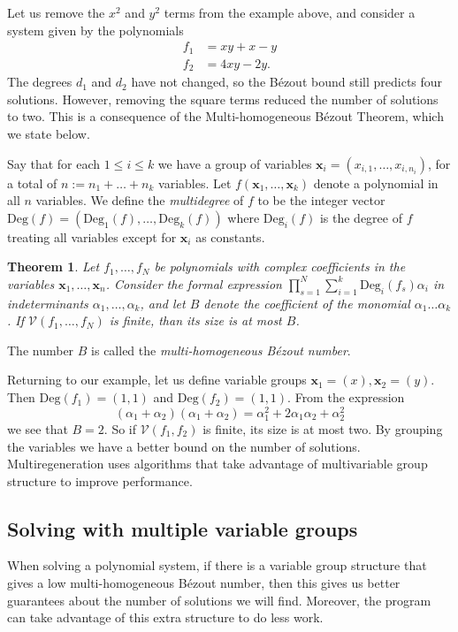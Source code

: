\documentclass[12pt]{article}
\newtheorem{theorem}{Theorem}[section]
\theoremstyle{definition}
\newcommand{\Deg}{\text{Deg}}
\begin{document}
Let us remove the $x^2$ and $y^2$ terms from the example above, and consider a system given by the polynomials
\begin{align*}
    f_1 &= xy + x - y\\
    f_2 &= 4xy - 2y.
\end{align*}
The degrees $d_1$ and $d_2$ have not changed, so the B\'{e}zout bound 
still predicts four solutions. However, removing the square terms 
reduced the number of solutions to two. This is a consequence of the 
Multi-homogeneous B\'{e}zout Theorem, which we state below.

Say that for each $1 \leq i \leq k$ we have a group of variables 
$\mathbf{x}_i = (x_{i,1}, \ldots, x_{i,n_i})$, for a total of $n := n_1 
+ \ldots + n_k$ variables. Let $f(\mathbf{x}_1, \ldots, 
\mathbf{x}_k)$ denote a polynomial in all $n$ variables. We define the 
\emph{multidegree} of $f$ to be the integer vector $\Deg(f) = 
(\Deg_1(f), \ldots, \Deg_k(f))$ where $\Deg_i(f)$ is the degree of $f$ 
treating all variables except for $\mathbf{x}_i$ as constants.

\begin{theorem}
Let $f_1, \ldots, f_N$ be polynomials with complex coefficients in the 
   variables $\mathbf{x}_1, 
\ldots, \mathbf{x}_n$. Consider the formal expression $\prod_{s = 1}^N 
\sum_{i = 1}^{k} \Deg_i(f_s) \alpha_i$ in indeterminants $\alpha_1, 
\ldots, \alpha_k$, and let $B$ denote the coefficient of the monomial 
$\alpha_1\ldots \alpha_k$. If $\mathcal{V}(f_1, \ldots, f_N)$ is finite, 
than its size is at most $B$.
\end{theorem}

The number $B$ is called the \emph{multi-homogeneous B\'{e}zout number}.

Returning to our example, let us define variable groups $\mathbf{x}_1 = 
(x), \mathbf{x}_2 = (y)$. Then $\Deg(f_1) = (1,1)$ and $\Deg(f_2) = 
(1,1)$. From the expression
\[
    (\alpha_1 + \alpha_2)(\alpha_1 + \alpha_2) = \alpha_1^2 + 
   2\alpha_1\alpha_2 + \alpha_2^2
\]
we see that $B = 2$. So if $\mathcal{V}(f_1, f_2)$ is finite, its size is 
at most two.
By grouping the variables we have a better bound on the number of solutions. 
Multiregeneration uses algorithms that take advantage of multivariable group structure to improve performance. 



\subsection{Solving with multiple variable groups}
When solving a polynomial system, if there is a variable group structure 
that gives a low multi-homogeneous B\'{e}zout number, then this 
gives us better guarantees about the number of solutions we will find. 
Moreover, the program can take advantage of this extra structure to do 
less work.
\end{document}
